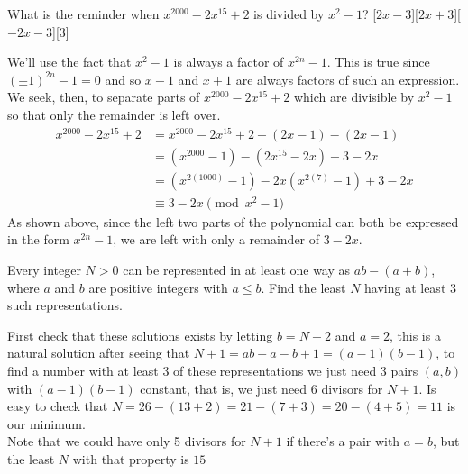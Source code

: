 \documentclass[12pt]{article}
\newcounter{problem}
\begin{document}
\begin{problem}
   What is the reminder when $x^{2000}-2x^{15}+2$ is divided by $x^2-1$?
   [$2x-3$][$2x+3$][$-2x-3$][3]
\end{problem}

\begin{solution}[A]
   We'll use the fact that $x^{2}-1$ is always a factor of $x^{2n}-1$. This is true since $(\pm1)^{2n}-1=0$ and so $x-1$ and $x+1$ are always factors of such an expression. We seek, then, to separate parts of $x^{2000}-2x^{15}+2$ which are divisible by $x^{2}-1$ so that only the remainder is left over.
    \begin{align*}
        x^{2000}-2x^{15}+2 &= x^{2000} - 2x^{15} +2 + (2x - 1) - (2x - 1)\\
        &= (x^{2000} - 1) - (2x^{15} - 2x) + 3 - 2x\\
        &= (x^{2(1000)} - 1) - 2x(x^{2(7)} - 1) + 3 - 2x\\
        &\equiv 3 - 2x \pmod{x^2-1}
    \end{align*}
    As shown above, since the left two parts of the polynomial can both be expressed in the form $x^{2n}-1$, we are left with only a remainder of $\boxed{3-2x}$.

\end{solution}


\begin{problem}[N][3][AMATYC Spring 2016/11]
   Every integer $N > 0$ can be represented in at least one way as $ab - (a + b)$, where $a$ and $b$ are positive integers with $a \leq b$. Find the least $N$ having at least 3 such representations.%
\end{problem}

\begin{solution}[12]
   First check that these solutions exists by letting $b=N+2$ and $a=2$, this is a natural solution after seeing that $N+1=ab-a-b+1=(a-1)(b-1)$, to find a number with at least 3 of these representations we just need 3 pairs $(a,b)$ with $(a-1)(b-1)$ constant, that is, we just need 6 divisors for $N+1$. Is easy to check that $N=26-(13+2)=21-(7+3)=20-(4+5)=\boxed{11}$ is our minimum.\\
    Note that we could have only 5 divisors for $N+1$ if there's a pair with $a=b$, but the least $N$ with that property is $15$
\end{solution}
\end{document}
